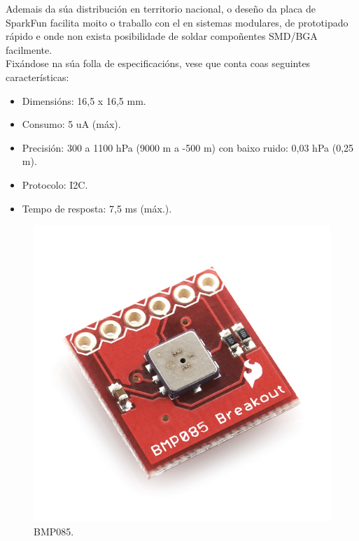   Ademais da súa distribución en territorio nacional, o deseño da placa de
  SparkFun facilita moito o traballo con el en sistemas modulares, de
  prototipado rápido e onde non exista posibilidade de soldar compoñentes
  SMD/BGA facilmente. \\

  Fixándose na súa folla de especificacións, vese que conta coas seguintes
  características:

  \begin{itemize}
   \item Dimensións: 16,5 x 16,5 mm.
   \item Consumo: 5 uA (máx).
   \item Precisión: 300 a 1100 hPa (9000 m a -500 m) con baixo ruido: 0,03 hPa
         (0,25 m).
   \item Protocolo: I2C.
   \item Tempo de resposta: 7,5 ms (máx.).
  \end{itemize}

  \begin{figure}[htbp]
   \centering
   \includegraphics[keepaspectratio=true]{./imagenes/bmp085.jpg}
   \caption{BMP085.}
   \label{figura:BMP085}
  \end{figure}

